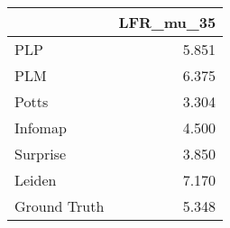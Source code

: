 \begin{tabular}{lr}
\toprule
{} & LFR_mu_35 \\
\midrule
PLP          &     5.851 \\
PLM          &     6.375 \\
Potts        &     3.304 \\
Infomap      &     4.500 \\
Surprise     &     3.850 \\
Leiden       &     7.170 \\
Ground Truth &     5.348 \\
\bottomrule
\end{tabular}
